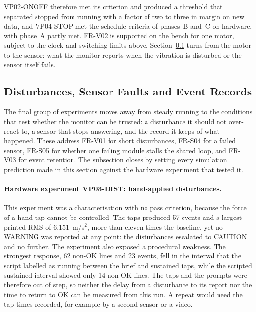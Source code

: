 VP02-ONOFF therefore met its criterion and produced a threshold that separated stopped from running
with a factor of two to three in margin on new data, and VP04-STOP met the schedule criteria of
phases~B and~C on hardware, with phase~A partly met. FR-V02 is supported on the bench for one motor,
subject to the clock and switching limits above. Section~\ref{sec:res-vib-faults} turns from the motor
to the sensor: what the monitor reports when the vibration is disturbed or the sensor itself fails.

\subsection{Disturbances, Sensor Faults and Event Records}
\label{sec:res-vib-faults}

The final group of experiments moves away from steady running to the conditions that test whether
the monitor can be trusted: a disturbance it should not over-react to, a sensor that stops answering,
and the record it keeps of what happened. These address FR-V01 for short disturbances, FR-S04 for a
failed sensor, FR-S05 for whether one failing module stalls the shared loop, and FR-V03 for event
retention. The subsection closes by setting every simulation prediction made in this section against
the hardware experiment that tested it.

\paragraph{Hardware experiment VP03-DIST: hand-applied disturbances.}
This experiment was a characterisation with no pass criterion, because the force of a hand tap cannot
be controlled. The taps produced 57 events and a largest printed RMS of 6.151~m/s$^2$, more than
eleven times the baseline, yet no WARNING was reported at any point: the disturbances escalated to
CAUTION and no further. The experiment also exposed a procedural weakness. The strongest response,
62 non-OK lines and 23 events, fell in the interval that the script labelled as running between the
brief and sustained taps, while the scripted sustained interval showed only 14 non-OK lines. The taps
and the prompts were therefore out of step, so neither the delay from a disturbance to its report nor
the time to return to OK can be measured from this run. A repeat would need the tap times recorded,
for example by a second sensor or a video.

